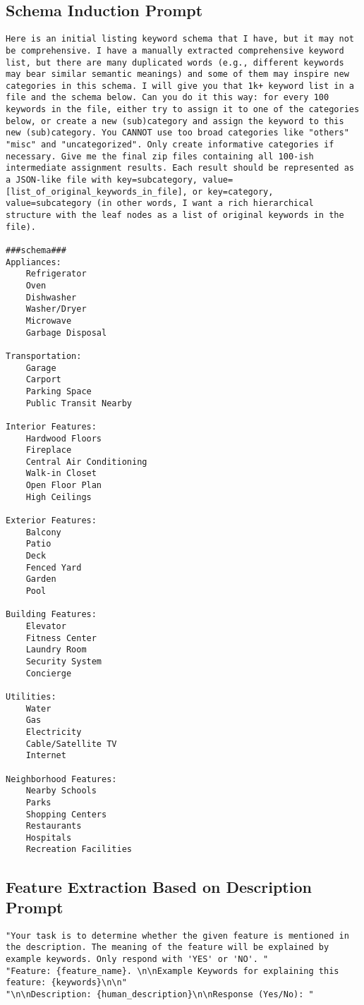 \subsection{Schema Induction Prompt}
\label{app: schema_induction}
\begin{lstlisting}
Here is an initial listing keyword schema that I have, but it may not be comprehensive. I have a manually extracted comprehensive keyword list, but there are many duplicated words (e.g., different keywords may bear similar semantic meanings) and some of them may inspire new categories in this schema. I will give you that 1k+ keyword list in a file and the schema below. Can you do it this way: for every 100 keywords in the file, either try to assign it to one of the categories below, or create a new (sub)category and assign the keyword to this new (sub)category. You CANNOT use too broad categories like "others" "misc" and "uncategorized". Only create informative categories if necessary. Give me the final zip files containing all 100-ish intermediate assignment results. Each result should be represented as a JSON-like file with key=subcategory, value=[list_of_original_keywords_in_file], or key=category, value=subcategory (in other words, I want a rich hierarchical structure with the leaf nodes as a list of original keywords in the file). 

###schema### 
Appliances:
    Refrigerator
    Oven
    Dishwasher
    Washer/Dryer
    Microwave
    Garbage Disposal

Transportation:
    Garage
    Carport
    Parking Space
    Public Transit Nearby

Interior Features:
    Hardwood Floors
    Fireplace
    Central Air Conditioning
    Walk-in Closet
    Open Floor Plan
    High Ceilings

Exterior Features:
    Balcony
    Patio
    Deck
    Fenced Yard
    Garden
    Pool

Building Features:
    Elevator
    Fitness Center
    Laundry Room
    Security System
    Concierge

Utilities:
    Water
    Gas
    Electricity
    Cable/Satellite TV
    Internet

Neighborhood Features:
    Nearby Schools
    Parks
    Shopping Centers
    Restaurants
    Hospitals
    Recreation Facilities
\end{lstlisting}
\subsection{Feature Extraction Based on Description Prompt}
\label{app: feature_extraction_based_on_description_prompt}
\begin{lstlisting}
"Your task is to determine whether the given feature is mentioned in the description. The meaning of the feature will be explained by example keywords. Only respond with 'YES' or 'NO'. "
"Feature: {feature_name}. \n\nExample Keywords for explaining this feature: {keywords}\n\n"
"\n\nDescription: {human_description}\n\nResponse (Yes/No): "
\end{lstlisting}

